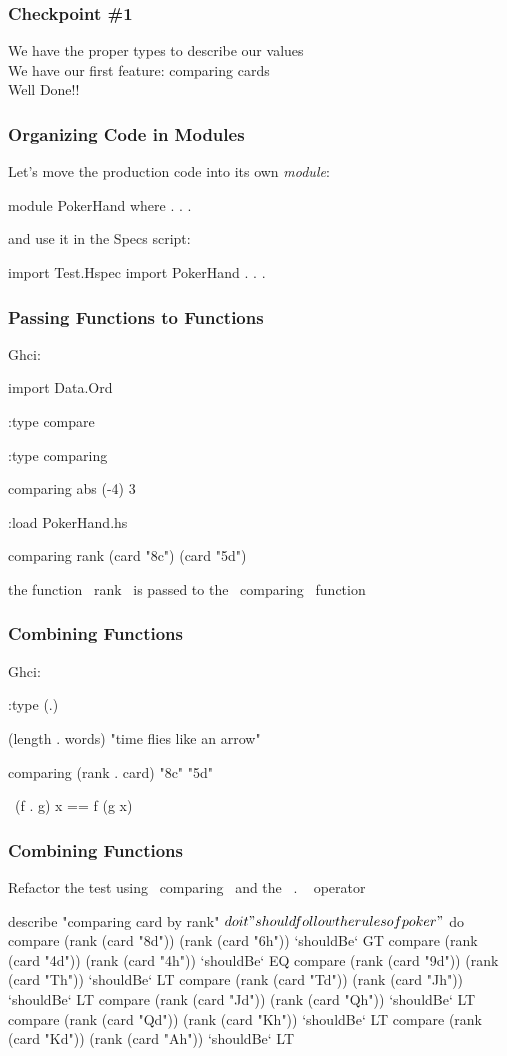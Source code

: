 \documentclass[11pt,xcolor={dvipsnames}]{beamer}
\newcommand{\tc}{\textcolor}
\newcommand{\key}[1]{\tc{orange}{#1}}
\newcommand{\rk}{\enskip{\key{$\hookleftarrow$}}}
\newcommand{\vs}{\vspace{1em}}
\begin{document}
\begin{frame}[fragile]
\frametitle{Checkpoint \#1}
\begin{center}
We have the proper types to describe our values\\
\vs
We have our first feature: comparing cards\\
\vs
\Large{Well Done!!}
\end{center}
\end{frame}
\begin{frame}[fragile]
\frametitle{Organizing Code in Modules}
Let's move the production code into its own \emph{module}:
\begin{haskell}[caption=PokerHand.hs]
module PokerHand
where
. . .
\end{haskell}
and use it in the Specs script:
\begin{hspec}
import Test.Hspec
import PokerHand
. . .
\end{hspec}
\end{frame}
\begin{frame}[fragile]
\frametitle{Passing Functions to Functions}
Ghci:
\begin{term}
import Data.Ord\rk

:type compare\rk

:type comparing\rk

comparing abs (-4) 3\rk

:load PokerHand.hs\rk

comparing rank (card "8c") (card "5d")\rk
\end{term}
the function ~rank~ is passed to the ~comparing~ function
\end{frame}
\begin{frame}[fragile]
\frametitle{Combining Functions}
Ghci:
\begin{term}
:type (.)\rk

(length . words) "time flies like an arrow"\rk

comparing (rank . card) "8c" "5d"\rk
\end{term}
~(f . g) x == f (g x)~ 
\end{frame}
\begin{frame}[fragile]
\frametitle{Combining Functions}
Refactor the test using ~comparing~ and the ~. ~ operator
\begin{hspec}[basicstyle=\color{black}\ttfamily\small]
describe "comparing card by rank" $ do
    it "should follow the rules of poker" $ do
        compare (rank (card "8d")) (rank (card "6h")) `shouldBe` GT
        compare (rank (card "4d")) (rank (card "4h")) `shouldBe` EQ
        compare (rank (card "9d")) (rank (card "Th")) `shouldBe` LT 
        compare (rank (card "Td")) (rank (card "Jh")) `shouldBe` LT 
        compare (rank (card "Jd")) (rank (card "Qh")) `shouldBe` LT 
        compare (rank (card "Qd")) (rank (card "Kh")) `shouldBe` LT 
        compare (rank (card "Kd")) (rank (card "Ah")) `shouldBe` LT 
\end{hspec}
\end{frame}
\end{document}
